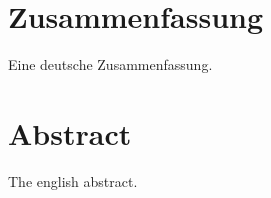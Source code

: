 \chapter*{Zusammenfassung}
\thispagestyle{empty}

Eine deutsche Zusammenfassung.

\chapter*{Abstract}
\thispagestyle{empty}

The english abstract.